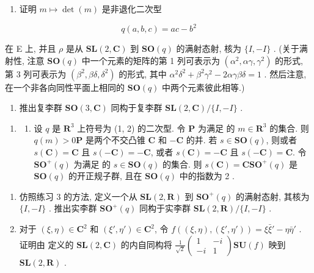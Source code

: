 \begin{enumerate}
\def\labelenumi{(\alph{enumi})}
\setcounter{enumi}{1}
\tightlist
\item
  证明 \(m \mapsto \det(m)\) 是非退化二次型
\end{enumerate}

\[
q (a, b, c) = a c - b ^ {2}
\]

在 E 上, 并且 \(\rho\) 是从 \(\mathbf{SL}(2,\mathbf{C})\) 到 \(\mathbf{SO}(q)\) 的满射态射, 核为 \(\{I, - I\}\) . (关于满射性, 注意 \(\mathbf{SO}(q)\) 中一个元素的矩阵的第 1 列可表示为 \((\alpha^2,\alpha \gamma ,\gamma^2)\) 的形式, 第 3 列可表示为 \((\beta^2,\beta \delta ,\delta^2)\) 的形式, 其中 \(\alpha^2\delta^2 +\beta^2\gamma^2 -2\alpha \gamma \beta \delta = 1\) . 然后注意, 在一个非各向同性平面上相同的 \(\mathbf{SO}(q)\) 中两个元素彼此相等.)

\begin{enumerate}
\def\labelenumi{(\alph{enumi})}
\setcounter{enumi}{2}
\tightlist
\item
  推出复李群 \(\mathbf{SO}(3, \mathbf{C})\) 同构于复李群 \(\mathbf{SL}(2, \mathbf{C}) / \{I, -I\}\) .
\end{enumerate}

\begin{enumerate}
\def\labelenumi{\arabic{enumi}.}
\setcounter{enumi}{3}
\tightlist
\item
  \begin{enumerate}
  \def\labelenumii{(\alph{enumii})}
  \tightlist
  \item
    设 \(q\) 是 \(\mathbf{R}^3\) 上符号为 (1, 2) 的二次型. 令 \(\mathbf{P}\) 为满足  的 \(m \in \mathbf{R}^3\) 的集合. 则 \(q(m) > 0\)\(\mathbf{P}\) 是两个不交凸锥 \(\mathbf{C}\) 和 \(-\mathbf{C}\) 的并. 若 \(s \in \mathbf{SO}(q)\), 则或者 \(s(\mathbf{C}) = \mathbf{C}\) 且 \(s(-\mathbf{C}) = -\mathbf{C}\), 或者 \(s(\mathbf{C}) = -\mathbf{C}\) 且 \(s(-\mathbf{C}) = \mathbf{C}\). 令 \(\mathbf{SO}^{+}(q)\) 为满足  的 \(s \in \mathbf{SO}(q)\) 的集合. 则 \(s(\mathbf{C}) = \mathbf{C}\)\(\mathbf{SO}^{+}(q)\) 是 \(\mathbf{SO}(q)\) 的开正规子群, 且在 \(\mathbf{SO}(q)\) 中的指数为 2 .
  \end{enumerate}
\end{enumerate}

\begin{enumerate}
\def\labelenumi{(\alph{enumi})}
\setcounter{enumi}{1}
\item
  仿照练习 3 的方法, 定义一个从 \(\mathbf{SL}(2,\mathbf{R})\) 到 \(\mathbf{SO}^{+}(q)\) 的满射态射, 其核为 \(\{I, - I\}\) . 推出实李群 \(\mathbf{SO}^{+}(q)\) 同构于实李群 \(\mathbf{SL}(2,\mathbf{R}) / \{I, - I\}\) .
\item
  对于 \((\xi, \eta) \in \mathbf{C}^2\) 和 \((\xi', \eta') \in \mathbf{C}^2\), 令 \(f((\xi, \eta), (\xi', \eta')) = \xi \bar{\xi}' - \eta \bar{\eta}'\) . 证明由  定义的 \(\mathbf{SL}(2, \mathbf{C})\) 的内自同构将 \(\frac{1}{\sqrt{2}} \begin{pmatrix} 1 & -i \\ -i & 1 \end{pmatrix}\)\(\mathbf{SU}(f)\) 映到 \(\mathbf{SL}(2, \mathbf{R})\) .
\end{enumerate}

